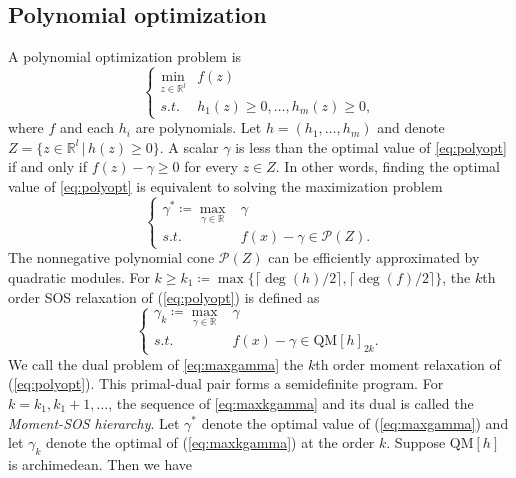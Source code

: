 \documentclass{amsart}
\newcommand{\reff}[1]{(\ref{#1})}
\theoremstyle{plain}
\newcommand{\re}{\mathbb{R}}
\newcommand{\st}{\mathit{s.t.}}
\numberwithin{equation}{section}
\begin{document}
		\subsection{Polynomial optimization}\label{ssc:po}
		A polynomial optimization problem is 
			\begin{equation}\label{eq:polyopt}
				\left\{\begin{array}{cl}
					\min\limits_{z\in \re^l} & f(z)\\
					\st & h_1(z)\ge 0,\ldots, h_m(z)\ge 0,
				\end{array}
				\right.
			\end{equation}
			where $f$ and each $h_i$ are polynomials.
		Let $h = (h_1,\ldots, h_m)$ and denote $Z = \{z\in\re^l\,\vert\, h(z)\ge 0\}$.
			A scalar $\gamma$ is less than the optimal value of \eqref{eq:polyopt} if 
			and only if $f(z)-\gamma\ge 0$ for every $z\in Z$.
			In other words, finding the optimal value of \eqref{eq:polyopt} is equivalent 
			to solving the maximization problem
			\begin{equation}\label{eq:maxgamma}
				\left\{\begin{array}{rl}
					\gamma^*\coloneqq \max\limits_{\gamma\in\re} & \gamma\\
					\st & f(x)-\gamma\in \mathscr{P}(Z).
				\end{array}
				\right.
			\end{equation}
		The nonnegative polynomial cone $\mathscr{P}(Z)$ can be efficiently approximated
			by quadratic modules. 
		For $k\ge k_1\coloneqq \max\{\lceil \deg(h)/2\rceil, \lceil \deg(f)/2\rceil\}$,
		the $k$th order SOS relaxation of \reff{eq:polyopt} is defined as
			\begin{equation}\label{eq:maxkgamma}
				\left\{\begin{array}{rl}
					\gamma_k\coloneqq\max\limits_{\gamma\in\re} & \gamma\\
					\st & f(x)-\gamma\in \mbox{QM}[h]_{2k}.
				\end{array}
				\right.
			\end{equation}
		We call the dual problem of \eqref{eq:maxgamma} the $k$th order moment relaxation of \reff{eq:polyopt}.
		This primal-dual pair forms a semidefinite program.
		For $k = k_1,k_1+1,\ldots$, the sequence of \eqref{eq:maxkgamma} and its dual is called the {\it Moment-SOS hierarchy}.
		Let $\gamma^*$ denote the optimal value of \reff{eq:maxgamma} and 
		let $\gamma_k$ denote the optimal of \reff{eq:maxkgamma} at the order $k$. 
		Suppose $\mbox{QM}[h]$ is archimedean. Then we have
\end{document}
